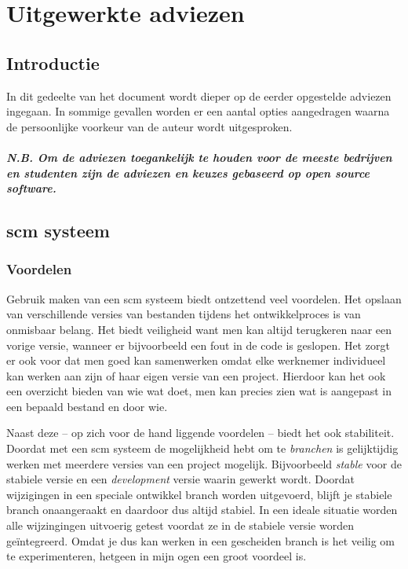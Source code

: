 \chapter{Uitgewerkte adviezen}

\section{Introductie}

In dit gedeelte van het document wordt dieper op de eerder opgestelde adviezen ingegaan. In sommige gevallen worden er een aantal opties aangedragen waarna de persoonlijke voorkeur van de auteur wordt uitgesproken.

\paragraph{N.B. Om de adviezen toegankelijk te houden voor de meeste bedrijven en studenten zijn de adviezen en keuzes gebaseerd op open source software.}

\section{{\sc scm} systeem}

\subsection{Voordelen}

Gebruik maken van een {\sc scm} systeem biedt ontzettend veel voordelen. Het opslaan van verschillende versies van bestanden tijdens het ontwikkelproces is van onmisbaar belang. Het biedt veiligheid want men kan altijd terugkeren naar een vorige versie, wanneer er bijvoorbeeld een fout in de code is geslopen. Het zorgt er ook voor dat men goed kan samenwerken omdat elke werknemer individueel kan werken aan zijn of haar eigen versie van een project. Hierdoor kan het ook een overzicht bieden van wie wat doet, men kan precies zien wat is aangepast in een bepaald bestand en door wie.

Naast deze -- op zich voor de hand liggende voordelen -- biedt het ook stabiliteit. Doordat met een {\sc scm} systeem de mogelijkheid hebt om te \emph{branchen} is gelijktijdig werken met meerdere versies van een project mogelijk. Bijvoorbeeld \emph{stable} voor de stabiele versie en een \emph{development} versie waarin gewerkt wordt. Doordat wijzigingen in een speciale ontwikkel branch worden uitgevoerd, blijft je stabiele branch onaangeraakt en daardoor dus altijd stabiel. In een ideale situatie worden alle wijzingingen uitvoerig getest voordat ze in de stabiele versie worden geïntegreerd. Omdat je dus kan werken in een gescheiden branch is het veilig om te experimenteren, hetgeen in mijn ogen een groot voordeel is.

